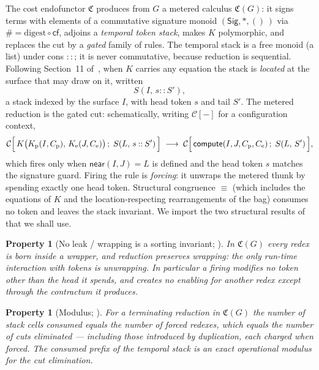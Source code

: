 \documentclass[11pt]{article}
\theoremstyle{definition}
\theoremstyle{plain}
\newtheorem{axiomx}[definition]{Property}
\newcommand{\Cost}{\mathfrak{C}}
\newcommand{\near}{\mathsf{near}}
\newcommand{\compute}{\mathsf{compute}}
\newcommand{\Kp}{K_{\mathrm{p}}}
\newcommand{\Ke}{K_{\mathrm{e}}}
\newcommand{\lstk}[2]{S(#1,\, #2)}     %
\newcommand{\cons}{\mathbin{::}}        %
\newcommand{\Seq}{\equiv}
\newcommand{\red}{\longrightarrow}
\newcommand{\Sig}{\mathsf{Sig}}
\newcommand{\hashf}{\#}
\newcommand{\cf}{\mathsf{cf}}
\theoremstyle{remark}
\begin{document}
The cost endofunctor $\Cost$ produces from $G$ a metered calculus
$\Cost(G)$: it signs terms with elements of a commutative signature
monoid $(\Sig,*,()\,)$ via $\hashf=\mathrm{digest}\circ\cf$, adjoins a
\emph{temporal token stack}, makes $K$ polymorphic, and replaces the cut
by a \emph{gated} family of rules. The temporal stack is a free monoid
(a list) under cons $\cons$; it is never commutative, because reduction
is sequential. Following Section~11 of~\cite{CostNote}, when $K$ carries
any equation the stack is \emph{located} at the surface that may draw on
it, written
\[
  \lstk{I}{s \cons S'},
\]
a stack indexed by the surface $I$, with head token $s$ and tail $S'$.
The metered reduction is the gated cut: schematically, writing
$\mathcal{C}[-]$ for a configuration context,
\begin{equation}
\label{eq:gatedcut}
  \mathcal{C}\Bigl[\,
     K\bigl(\Kp(I, C_{\mathrm p}),\, \Ke(J, C_{\mathrm e})\bigr)
     \,;\; \lstk{L}{s \cons S'}
  \,\Bigr]
  \;\red\;
  \mathcal{C}\Bigl[\,
     \compute(I,J,C_{\mathrm p}, C_{\mathrm e})
     \,;\; \lstk{L}{S'}
  \,\Bigr],
\end{equation}
which fires only when $\near(I,J)=L$ is defined and the head token $s$
matches the signature guard. Firing the rule is \emph{forcing}: it
unwraps the metered thunk by spending exactly one head token. Structural
congruence $\Seq$ (which includes the equations of $K$ and the
location-respecting rearrangements of the bag) consumes no token and
leaves the stack invariant. We import the two structural results
of~\cite{CostNote} that we shall use.

\begin{axiomx}[No leak / wrapping is a sorting invariant; {\cite[Lemma on subject reduction]{CostNote}}]
\label{ax:noleak}
In $\Cost(G)$ every redex is born inside a wrapper, and reduction
preserves wrapping: the only run-time interaction with tokens is
unwrapping. In particular a firing modifies no token other than the head
it spends, and creates no enabling for another redex except through the
contractum it produces.
\end{axiomx}

\begin{axiomx}[Modulus; {\cite[Prop.\ ``stack consumption is the modulus'']{CostNote}}]
\label{ax:modulus}
For a terminating reduction in $\Cost(G)$ the number of stack cells
consumed equals the number of forced redexes, which equals the number of
cuts eliminated --- including those introduced by duplication, each
charged when forced. The consumed prefix of the temporal stack is an
exact operational modulus for the cut elimination.
\end{axiomx}
\end{document}
